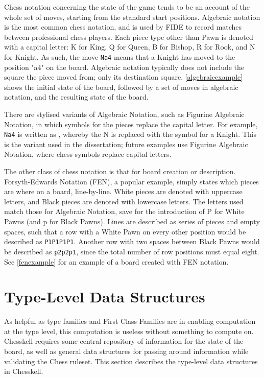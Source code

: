 \documentclass[12pt, a4paper, bibliography=totocnumbered]{scrreprt}
\begin{document}
Chess notation concerning the state of the game tends to be an account of the whole set of moves, starting from the standard start positions. Algebraic notation is the most common chess notation, and is used by FIDE to record matches between professional chess players. Each piece type other than Pawn is denoted with a capital letter: K for King, Q for Queen, B for Bishop, R for Rook, and N for Knight. As such, the move \texttt{Na4} means that a Knight has moved to the position "a4" on the board. Algebraic notation typically does not include the square the piece moved from; only its destination square. \cref{algebraicexample} shows the initial state of the board, followed by a set of moves in algebraic notation, and the resulting state of the board.

There are stylised variants of Algebraic Notation, such as Figurine Algebraic Notation, in which symbols for the pieces replace the capital letter. For example, \texttt{Na4} is written as , whereby the N is replaced with the symbol for a Knight. This is the variant used in the dissertation; future examples use Figurine Algebraic Notation, where chess symbols replace capital letters.

The other class of chess notation is that for board creation or description. Forsyth-Edwards Notation (FEN), a popular example, simply states which pieces are where on a board, line-by-line. White pieces are denoted with uppercase letters, and Black pieces are denoted with lowercase letters. The letters used match those for Algebraic Notation, save for the introduction of P for White Pawns (and p for Black Pawns). Lines are described as series of pieces and empty spaces, such that a row with a White Pawn on every other position would be described as \texttt{P1P1P1P1}. Another row with two spaces between Black Pawns would be described as \texttt{p2p2p1}, since the total number of row positions must equal eight. See \cref{fenexample} for an example of a board created with FEN notation.

\section{Type-Level Data Structures}

As helpful as type families and First Class Families are in enabling computation at the type level, this computation is useless without something to compute on. Chesskell requires some central repository of information for the state of the board, as well as general data structures for passing around information while validating the Chess ruleset. This section describes the type-level data structures in Chesskell.
\end{document}
